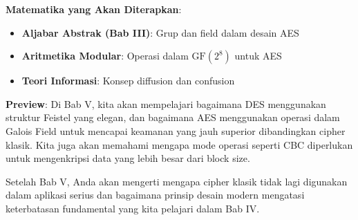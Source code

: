 \documentclass[main.tex]{subfiles}
\begin{document}
\begin{transition}
\textbf{Matematika yang Akan Diterapkan}:
\begin{itemize}
  \item \textbf{Aljabar Abstrak (Bab III)}: Grup dan field dalam desain AES
  \item \textbf{Aritmetika Modular}: Operasi dalam $\mathrm{GF}(2^8)$ untuk AES
  \item \textbf{Teori Informasi}: Konsep diffusion dan confusion
\end{itemize}

\textbf{Preview}: Di Bab V, kita akan mempelajari bagaimana DES menggunakan struktur Feistel yang elegan, dan bagaimana AES menggunakan operasi dalam Galois Field untuk mencapai keamanan yang jauh superior dibandingkan cipher klasik. Kita juga akan memahami mengapa mode operasi seperti CBC diperlukan untuk mengenkripsi data yang lebih besar dari block size.

Setelah Bab V, Anda akan mengerti mengapa cipher klasik tidak lagi digunakan dalam aplikasi serius dan bagaimana prinsip desain modern mengatasi keterbatasan fundamental yang kita pelajari dalam Bab IV.
\end{transition}

\ifSubfilesClassLoaded{
  \renewcommand{\bibname}{Daftar Pustaka}
  
  
}{}
\end{document}
